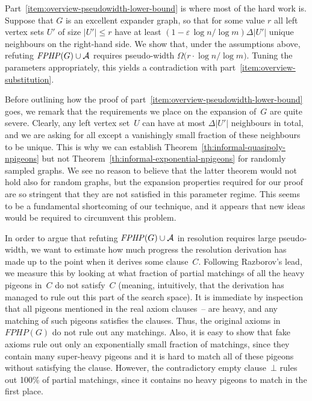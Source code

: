\documentclass{article}
\newcommand{\Bigomega}[1]{\Omega \bigl( #1 \bigr)}
\newcommand{\Setsize}[1]{\bigl\lvert#1\bigr\rvert}
\newcommand{\setsize}[1]{\lvert#1\rvert}
\newcommand{\union}{\cup}
\newcommand{\refth}[1]{Theorem~\ref{#1}}
\newcommand{\emptycl}{\bot}
\newcommand{\clc}{\ensuremath{C}}
\newcommand{\formulaformat}[1]{\mathit{#1}}
\newcommand{\graphfphpnot}[1][G]{\formulaformat{FPHP}({#1})}
\newcommand{\fakeaxiomintro}{fake axiom\xspace}
\newcommand{\heavy}{heavy\xspace}
\newcommand{\sheavy}{super-heavy\xspace}
\newcommand{\superheavy}{\sheavy}
\newcommand{\GFPHP}{G\text{-}FPHP}
\renewcommand{\GFPHP}{\graphfphpnot[G]}
\newcommand{\GdegMax}{\Delta}
\newcommand{\gdegmax}{\GdegMax}
\newcommand{\Ax}{\ensuremath\mathcal{A}}
\numberwithin{equation}{section}
\begin{document}
Part~\ref{item:overview-pseudowidth-lower-bound} is where most of the
hard work is.
Suppose that
$G$ is an excellent 
expander graph, so that for some value $r$ 
all left vertex sets $U'$ of size $\Setsize{U'} \leq r$
have at least
\mbox{$
(1 - \varepsilon\, {\log n}/{\log m})\gdegmax \setsize{U'}
$}
unique neighbours on the right-hand side.
We show that, under the assumptions above, refuting
$\GFPHP \union \Ax$
requires pseudo-width
$
\Bigomega{
  {r \cdot \log n} / {\log m}
}
$.
Tuning the parameters appropriately, this yields a contradiction with
part~\ref{item:overview-substitution}.

Before outlining how the proof of
part~\ref{item:overview-pseudowidth-lower-bound} goes,
we remark that the requirements we place on the expansion of~$G$ are
quite severe. Clearly, any left vertex set~$U$ can have at most
$\gdegmax \setsize{U'}$ neighbours in total, and we are asking for
all except a vanishingly small fraction of these neighbours to be
unique. This is why we can establish
\refth{th:informal-quasipoly-npigeons}  
but not
\refth{th:informal-exponential-npigeons}
for randomly sampled graphs. We see no reason to believe that the
latter theorem would not hold also for random graphs, 
but the expansion properties required for our
proof
are so stringent that they are not satisfied 
in this parameter regime.  This seems to be a fundamental
shortcoming of our technique, and it appears that new ideas would be
required to circumvent this problem.

In order to argue that refuting
$\GFPHP \union \Ax$
in resolution requires large pseudo-width, we
want to
estimate how much
progress the resolution derivation has made up to the point when it
derives some clause~$\clc$. Following Razborov's lead, we measure this
by looking at what fraction of partial matchings of all the \heavy
pigeons in~$\clc$ do not satisfy~$\clc$ (meaning, intuitively, that
the derivation has managed to rule out this part of the search space).
It is immediate by inspection that 
all pigeons mentioned in the
real
axiom clauses~--
are \heavy, 
and any matching of such pigeons satisfies the clauses. Thus, 
the original axioms in~$\GFPHP$ do not rule out any matchings.
Also, it is easy to show that \fakeaxiomintro{}s rule out only an
exponentially small fraction of matchings, since they contain many
\superheavy pigeons and it is hard to match all of these pigeons
without satisfying the clause.
However, the contradictory empty clause~$\emptycl$ rules out
100\% of partial matchings, since it contains no \heavy pigeons to
match in the first place.
\end{document}
